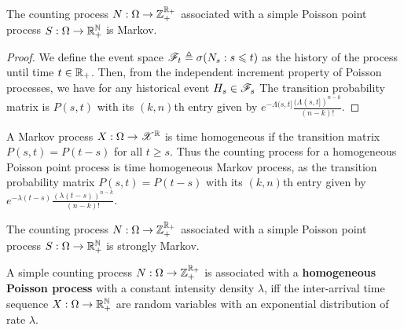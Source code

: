 \documentclass[letterpaper,10pt,english]{article}
\begin{document}
\begin{prop} 
The counting process $N:\Omega\to\mathbb{Z}_+^{\mathbb{R}_+}$ 
associated with a simple Poisson point process $S:\Omega\to\mathbb{R}_+^{\mathbb{N}}$ 
is Markov. 
\end{prop}
\begin{proof} 
We define the event space $\mathscr{F}_t \triangleq \sigma(N_s: s \leqslant t)$ as the history of the process until time $t \in \mathbb{R}_+$. 
Then, from the independent increment property of Poisson processes, we have for any historical event $H_s \in \mathscr{F}_s$ 
The transition probability matrix is $P(s,t)$ with its $(k,n)$th entry given by $e^{-\Lambda(s,t]}\frac{(\Lambda(s,t])^{n-k}}{(n-k)!}$. 
\end{proof}
\begin{rem}
A Markov process $X:\Omega\to\mathscr{X}^{\mathbb{R}}$ is time homogeneous if the transition matrix $P(s,t) = P(t-s)$ for all $t \ge s$. 
Thus the counting process for a homogeneous Poisson point process is time homogeneous Markov process, as the transition probability matrix $P(s,t) = P(t-s)$ with its $(k,n)$th entry given by $e^{-\lambda(t-s)}\frac{(\lambda(t-s))^{n-k}}{(n-k)!}$. 
\end{rem}
\begin{thm} 
The counting process $N:\Omega\to\mathbb{Z}_+^{\mathbb{R}_+}$ 
associated with a simple Poisson point process $S:\Omega\to\mathbb{R}_+^{\mathbb{N}}$ 
is strongly Markov. 
\end{thm}
\begin{prop}
A simple counting process $N:\Omega\to\mathbb{Z}_+^{\mathbb{R}_+}$ is associated with a \textbf{homogeneous Poisson process} with a constant intensity density $\lambda$, 
iff the inter-arrival time sequence $X:\Omega\to\mathbb{R}_+^{\mathbb{N}}$ are \iid random variables with an exponential distribution of rate $\lambda$. 
\end{prop}
\end{document}
